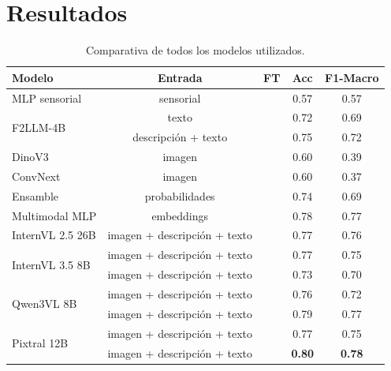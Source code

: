 \documentclass[11pt,a4paper]{article}
\newcommand{\cmark}{\ding{51}} %
\newcommand{\xmark}{\ding{55}} %
\begin{document}
\section{Resultados}
\begin{table}[h]
	\centering
	\small
	\begin{tabular}{@{}lcccc@{}}
		\toprule
		\textbf{Modelo} & \textbf{Entrada} & \textbf{FT} & \textbf{Acc} & \textbf{F1-Macro} \\
		\midrule
		\multirow{1}{*}{MLP sensorial}
		& sensorial          & \xmark       &    0.57          &     0.57         \\
		\midrule
		\multirow{2}{*}{F2LLM-4B}
		& texto          & \cmark       &   0.72          &    0.69          \\
		& descripción + texto          & \cmark       &   0.75           &     0.72        \\
		\midrule
		\multirow{1}{*}{DinoV3}
		& imagen          & \cmark       &    0.60          &     0.39         \\
		\midrule
		\multirow{1}{*}{ConvNext}
		& imagen             & \cmark       &     0.60         &    0.37        \\
		\midrule
		\multirow{1}{*}{Ensamble}
		& probabilidades             & \xmark       &     0.74         &    0.69        \\
		\midrule
		\multirow{1}{*}{Multimodal MLP}
		& embeddings             & \xmark       &     0.78         &    0.77        \\
		\midrule
		\multirow{1}{*}{InternVL 2.5 26B}
		& imagen + descripción + texto    &  \xmark       &     0.77         &    0.76        \\
		\midrule
		\multirow{2}{*}{InternVL 3.5 8B}
		& imagen + descripción + texto    &  \xmark       &     0.77         &    0.75        \\
		& imagen + descripción + texto    &  \cmark       &     0.73         &    0.70        \\
		
		\midrule
		\multirow{2}{*}{Qwen3VL 8B}
		& imagen + descripción + texto    &  \xmark       &     0.76         &    0.72        \\
		& imagen + descripción + texto    &  \cmark       &     0.79         &    0.77        \\
		\midrule
		\multirow{2}{*}{Pixtral 12B}
		& imagen + descripción + texto    &  \xmark       &     0.77         &    0.75        \\
		& imagen + descripción + texto    &  \cmark       &     \textbf{0.80}         &    \textbf{0.78}        \\
		\bottomrule
	\end{tabular}
	\caption{Comparativa de todos los modelos utilizados.}
\end{table}
\end{document}
